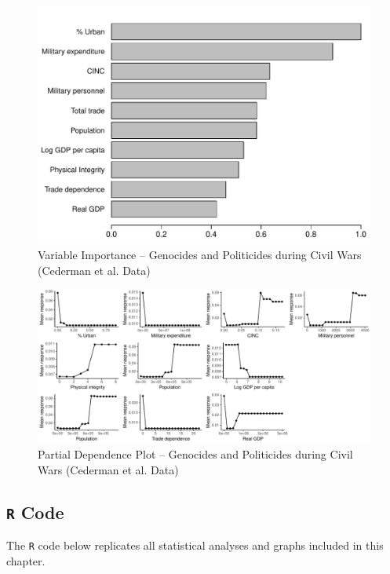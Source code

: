 \begin{figure}[H]
    \centering
    \includegraphics[width=.85\textwidth]{images/rf-uamk-eth.pdf}
    \caption{Variable Importance -- Genocides and Politicides during Civil Wars (Cederman et al. Data)}
    \label{fig:rf-mk-ucdp}
\end{figure}

\newpage 

\clearpage
\begin{figure}
    \centering
    \includegraphics[width=\textwidth]{images/rf-uamk-eth-pd.pdf}
    \caption{Partial Dependence Plot -- Genocides and Politicides during Civil Wars (Cederman et al. Data)}
    \label{fig:rf-mk-ucdp-pd}
\end{figure}
\clearpage

\subsection{\texttt{R} Code}

The \texttt{R} code below replicates all statistical analyses and graphs included in this chapter. 


